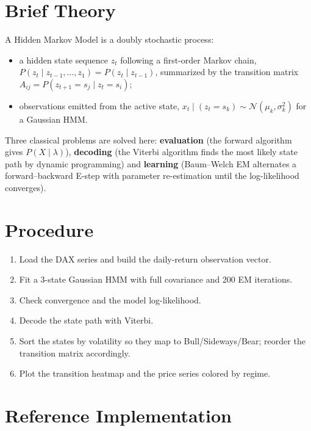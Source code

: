 \section{Brief Theory}
A Hidden Markov Model is a doubly stochastic process:
\begin{itemize}
  \item a hidden state sequence $z_t$ following a first-order Markov chain,
        $P(z_t \mid z_{t-1}, \dots, z_1) = P(z_t \mid z_{t-1})$, summarized by the transition
        matrix $A_{ij} = P(z_{t+1} = s_j \mid z_t = s_i)$;
  \item observations emitted from the active state,
        $x_t \mid (z_t = s_k) \sim \mathcal{N}(\mu_k, \sigma_k^2)$ for a Gaussian HMM.
\end{itemize}
Three classical problems are solved here: \textbf{evaluation} (the forward algorithm gives
$P(X \mid \lambda)$), \textbf{decoding} (the Viterbi algorithm finds the most likely state
path by dynamic programming) and \textbf{learning} (Baum--Welch EM alternates a
forward--backward E-step with parameter re-estimation until the log-likelihood converges).

\section{Procedure}
\begin{enumerate}
  \item Load the DAX series and build the daily-return observation vector.
  \item Fit a 3-state Gaussian HMM with full covariance and 200 EM iterations.
  \item Check convergence and the model log-likelihood.
  \item Decode the state path with Viterbi.
  \item Sort the states by volatility so they map to Bull/Sideways/Bear; reorder the transition
        matrix accordingly.
  \item Plot the transition heatmap and the price series colored by regime.
\end{enumerate}

\section{Reference Implementation}


